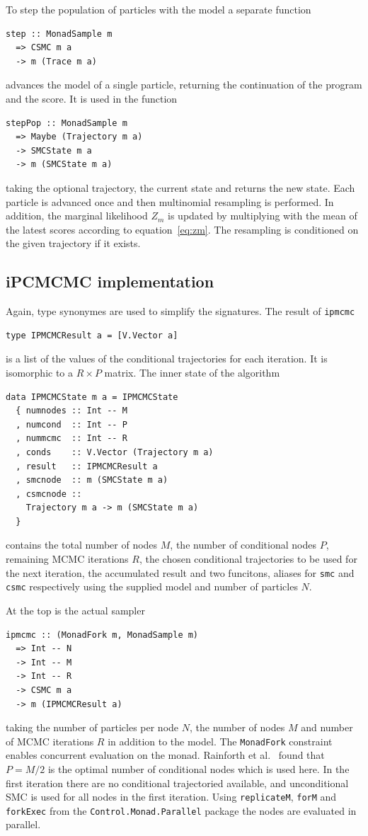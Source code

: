 To step the population of particles with the model a separate function
\begin{verbatim}
step :: MonadSample m
  => CSMC m a
  -> m (Trace m a)
\end{verbatim}
advances the model of a single particle, returning the continuation of the program and the score. It is used in the function
\begin{verbatim}
stepPop :: MonadSample m
  => Maybe (Trajectory m a)
  -> SMCState m a
  -> m (SMCState m a)
\end{verbatim}
taking the optional trajectory, the current state and returns the new state. Each particle is advanced once and then multinomial resampling is performed. In addition, the marginal likelihood $Z_m$ is updated by multiplying with the mean of the latest scores according to equation~\ref{eq:zm}. The resampling is conditioned on the given trajectory if it exists.

\subsection{iPCMCMC implementation}
\label{sub:ipcmcmc_implementation}

Again, type synonymes are used to simplify the signatures. The result of \texttt{ipmcmc}
\begin{verbatim}
type IPMCMCResult a = [V.Vector a]
\end{verbatim}
is a list of the values of the conditional trajectories for each iteration. It is isomorphic to a $R\times P$ matrix. The inner state of the algorithm
\begin{verbatim}
data IPMCMCState m a = IPMCMCState
  { numnodes :: Int -- M
  , numcond  :: Int -- P
  , nummcmc  :: Int -- R
  , conds    :: V.Vector (Trajectory m a) 
  , result   :: IPMCMCResult a 
  , smcnode  :: m (SMCState m a) 
  , csmcnode ::
    Trajectory m a -> m (SMCState m a) 
  }
\end{verbatim}
contains the total number of nodes $M$, the number of conditional nodes $P$, remaining MCMC iterations $R$, the chosen conditional trajectories to be used for the next iteration, the accumulated result and two funcitons, aliases for \texttt{smc} and \texttt{csmc} respectively using the supplied model and number of particles $N$.

At the top is the actual sampler
\begin{verbatim}
ipmcmc :: (MonadFork m, MonadSample m)
  => Int -- N
  -> Int -- M
  -> Int -- R
  -> CSMC m a
  -> m (IPMCMCResult a)
\end{verbatim}
taking the number of particles per node $N$, the number of nodes $M$ and number of MCMC iterations $R$ in addition to the model. The \texttt{MonadFork} constraint enables concurrent evaluation on the monad. Rainforth et al.~\cite{ipmcmc} found that $P = M/2$ is the optimal number of conditional nodes which is used here. In the first iteration there are no conditional trajectoried available, and unconditional SMC is used for all nodes in the first iteration. Using \texttt{replicateM}, \texttt{forM} and \texttt{forkExec} from the \texttt{Control.Monad.Parallel} package the nodes are evaluated in parallel.

